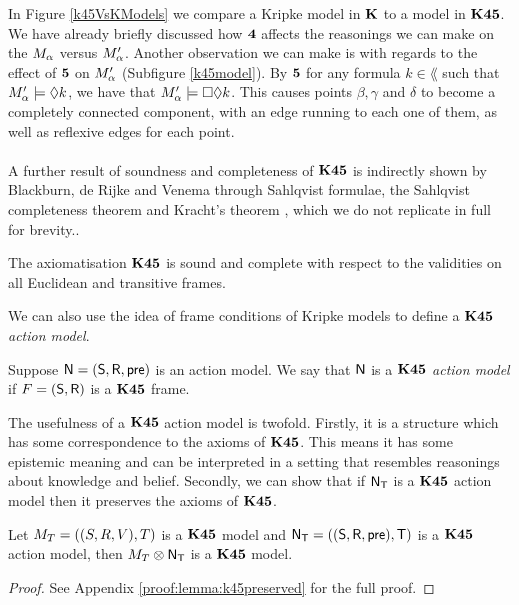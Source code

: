 In Figure \ref{k45VsKModels} we compare a Kripke model in $\bf K$ to a model in $\bf K45$.
We have already briefly discussed how $\bf 4$ affects the reasonings we can make on the $M_\alpha$ versus
$M'_\alpha$.
Another observation we can make is with regards to the effect of $\bf 5$ on $M'_\alpha$ (Subfigure
\ref{k45model}).
By $\bf 5$ for any formula $k \in \lang$ such that $M'_\alpha \models
\Diamond k$, we have that $M'_\alpha \models \Box \Diamond k$.
This causes points $\beta, \gamma$ and $\delta$ to become a completely connected component,
with an edge running to each one of them, as well as reflexive edges for each point.\\
\\
A further result of soundness and completeness of $\bf K45$ is indirectly shown by Blackburn, de Rijke and Venema
\cite{blackburn2002modal} through Sahlqvist formulae, the Sahlqvist completeness theorem and Kracht's
theorem \cite{2594394}, which we do not replicate in full for brevity..

\begin{lemma} \label{axiomK45SoundComplete}
The axiomatisation $\bf K45$ is sound and complete with respect to the validities on all Euclidean
and transitive frames.
\end{lemma}

We can also use the idea of frame conditions of Kripke models to define a {\em $\bf K45$ action
model}.

\begin{defn} \label{defn:k45eventModel}
	Suppose $\mathrm{\mathsf{N}} = (\mathrm{\mathsf{S}}, \mathrm{\mathsf{R}}, \mathrm{\mathsf{pre}})$ is an action model.
	We say that $\mathrm{\mathsf{N}}$ is a {\em $\bf K45$ action model} if $F = (\mathrm{\mathsf{S}}, \mathrm{\mathsf{R}})$ is a $\bf K45$ frame.
\end{defn}

The usefulness of a $\bf K45$ action model is twofold.
Firstly, it is a structure which has some correspondence to the axioms of $\bf K45$.
This means it has some epistemic meaning and can be interpreted in a setting that resembles
reasonings about knowledge and belief.
Secondly, we can show that if $\mathrm{\mathsf{N}}_\mathrm{\mathsf{T}}$ is a $\bf K45$ action model then it preserves the axioms of
$\bf K45$.

\begin{lemma} \label{lemma:k45preserved}
	Let $M_T = ((S,R,V),T)$ is a $\bf K45$ model and $\mathrm{\mathsf{N}}_\mathrm{\mathsf{T}} = ((\mathrm{\mathsf{S}},\mathrm{\mathsf{R}},\mathrm{\mathsf{pre}}),\mathrm{\mathsf{T}})$ is a $\bf K45$ action model, then
	$M_T \otimes \mathrm{\mathsf{N}}_\mathrm{\mathsf{T}}$ is a $\bf K45$ model.
\end{lemma}
\begin{proof}
	See Appendix \ref{proof:lemma:k45preserved} for the full proof.
\end{proof}

